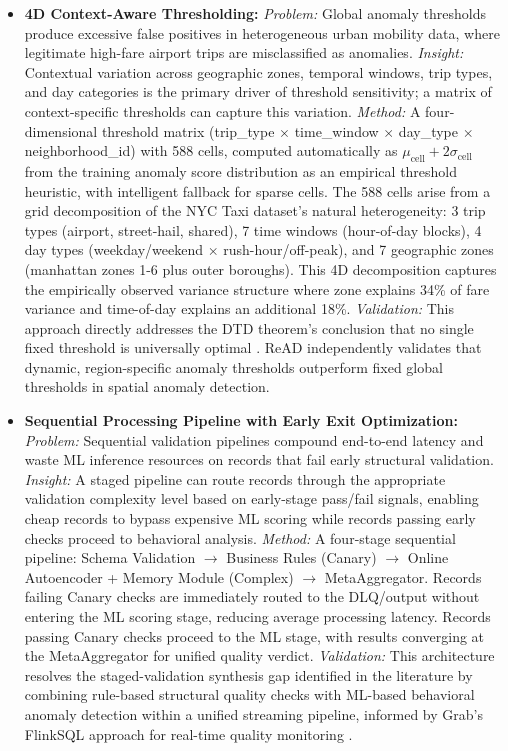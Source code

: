 \begin{itemize}
    \item \textbf{4D Context-Aware Thresholding:} \textit{Problem:} Global anomaly thresholds produce excessive false positives in heterogeneous urban mobility data, where legitimate high-fare airport trips are misclassified as anomalies. \textit{Insight:} Contextual variation across geographic zones, temporal windows, trip types, and day categories is the primary driver of threshold sensitivity; a matrix of context-specific thresholds can capture this variation. \textit{Method:} A four-dimensional threshold matrix (trip\_type $\times$ time\_window $\times$ day\_type $\times$ neighborhood\_id) with 588 cells, computed automatically as $\mu_{\text{cell}} + 2\sigma_{\text{cell}}$ from the training anomaly score distribution as an empirical threshold heuristic, with intelligent fallback for sparse cells. The 588 cells arise from a grid decomposition of the NYC Taxi dataset's natural heterogeneity: 3 trip types (airport, street-hail, shared), 7 time windows (hour-of-day blocks), 4 day types (weekday/weekend $\times$ rush-hour/off-peak), and 7 geographic zones (manhattan zones 1-6 plus outer boroughs). This 4D decomposition captures the empirically observed variance structure where zone explains 34\% of fare variance and time-of-day explains an additional 18\%. \textit{Validation:} This approach directly addresses the DTD theorem's conclusion that no single fixed threshold is universally optimal \cite{dtd2026}. ReAD \cite{read2020} independently validates that dynamic, region-specific anomaly thresholds outperform fixed global thresholds in spatial anomaly detection.

    \item \textbf{Sequential Processing Pipeline with Early Exit Optimization:} \textit{Problem:} Sequential validation pipelines compound end-to-end latency and waste ML inference resources on records that fail early structural validation. \textit{Insight:} A staged pipeline can route records through the appropriate validation complexity level based on early-stage pass/fail signals, enabling cheap records to bypass expensive ML scoring while records passing early checks proceed to behavioral analysis. \textit{Method:} A four-stage sequential pipeline: Schema Validation $\rightarrow$ Business Rules (Canary) $\rightarrow$ Online Autoencoder + Memory Module (Complex) $\rightarrow$ MetaAggregator. Records failing Canary checks are immediately routed to the DLQ/output without entering the ML scoring stage, reducing average processing latency. Records passing Canary checks proceed to the ML stage, with results converging at the MetaAggregator for unified quality verdict. \textit{Validation:} This architecture resolves the staged-validation synthesis gap identified in the literature \cite{contextdq2022} by combining rule-based structural quality checks with ML-based behavioral anomaly detection within a unified streaming pipeline, informed by Grab's FlinkSQL approach for real-time quality monitoring \cite{grab_coban2025}.


\end{itemize}
